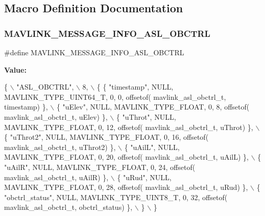 \subsection{Macro Definition Documentation}
\mbox{\label{mavlink__msg__asl__obctrl_8h_a97832933e3ef32da416d9e4c55b0d24a}} 
\subsubsection{M\+A\+V\+L\+I\+N\+K\+\_\+\+M\+E\+S\+S\+A\+G\+E\+\_\+\+I\+N\+F\+O\+\_\+\+A\+S\+L\+\_\+\+O\+B\+C\+T\+RL}
{\footnotesize\ttfamily \#define M\+A\+V\+L\+I\+N\+K\+\_\+\+M\+E\+S\+S\+A\+G\+E\+\_\+\+I\+N\+F\+O\+\_\+\+A\+S\+L\+\_\+\+O\+B\+C\+T\+RL}

{\bfseries Value\+:}
\begin{DoxyCode}
\{ \(\backslash\)
    \textcolor{stringliteral}{"ASL\_OBCTRL"}, \(\backslash\)
    8, \(\backslash\)
    \{  \{ \textcolor{stringliteral}{"timestamp"}, NULL, MAVLINK_TYPE_UINT64_T, 0, 0, offsetof(
      mavlink_asl_obctrl_t, timestamp) \}, \(\backslash\)
         \{ \textcolor{stringliteral}{"uElev"}, NULL, MAVLINK_TYPE_FLOAT, 0, 8, offsetof(
      mavlink_asl_obctrl_t, uElev) \}, \(\backslash\)
         \{ \textcolor{stringliteral}{"uThrot"}, NULL, MAVLINK_TYPE_FLOAT, 0, 12, offsetof(
      mavlink_asl_obctrl_t, uThrot) \}, \(\backslash\)
         \{ \textcolor{stringliteral}{"uThrot2"}, NULL, MAVLINK_TYPE_FLOAT, 0, 16, offsetof(
      mavlink_asl_obctrl_t, uThrot2) \}, \(\backslash\)
         \{ \textcolor{stringliteral}{"uAilL"}, NULL, MAVLINK_TYPE_FLOAT, 0, 20, offsetof(
      mavlink_asl_obctrl_t, uAilL) \}, \(\backslash\)
         \{ \textcolor{stringliteral}{"uAilR"}, NULL, MAVLINK_TYPE_FLOAT, 0, 24, offsetof(
      mavlink_asl_obctrl_t, uAilR) \}, \(\backslash\)
         \{ \textcolor{stringliteral}{"uRud"}, NULL, MAVLINK_TYPE_FLOAT, 0, 28, offsetof(
      mavlink_asl_obctrl_t, uRud) \}, \(\backslash\)
         \{ \textcolor{stringliteral}{"obctrl\_status"}, NULL, MAVLINK_TYPE_UINT8_T, 0, 32, offsetof(
      mavlink_asl_obctrl_t, obctrl\_status) \}, \(\backslash\)
         \} \(\backslash\)
\}
\end{DoxyCode}
\mbox{\label{mavlink__msg__asl__obctrl_8h_a5938474ef8b9a9b3d66bddeac8b3df2b}} 
